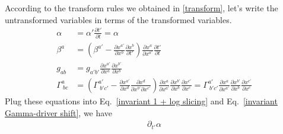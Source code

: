 \documentclass[letterpaper,nofootinbib,prd,amsmath,onecolumn]{revtex4-1}
\begin{document}
According to the transform rules we obtained in \ref{transform}, let's write the untransformed variables in terms of the transformed variables. 
\begin{align}
\alpha & = \alpha'\frac{\partial t'}{\partial t} = \alpha\\
\beta^{a} & = \left(\beta^{a'} - \frac{\partial x^{a'}}{\partial x^{b}}\frac{\partial x^{b}}{\partial t'}\right)\frac{\partial x^{a}}{\partial x^{a'}}\frac{\partial t'}{\partial t}\\
g_{ab} & = g_{a'b'}\frac{\partial x^{a'}}{\partial x^{a}}\frac{\partial x^{b'}}{\partial x^{b}}\\
\Gamma^{a}_{~bc} & = \left(\Gamma^{a'}_{~b'c'} - \frac{\partial x^{a'}}{\partial x^{d}}\frac{\partial x^{d}}{\partial x^{b'}\partial x^{c'}}\right)\frac{\partial x^{a}}{\partial x^{a'}}\frac{\partial x^{b'}}{\partial x^{b}}\frac{\partial x^{c'}}{\partial x^{c}} = \Gamma^{a'}_{~b'c'}\frac{\partial x^{a}}{\partial x^{a'}}\frac{\partial x^{b'}}{\partial x^{b}}\frac{\partial x^{c'}}{\partial x^{c}}
\end{align}
Plug these equations into Eq.~\ref{invariant 1 + log slicing} and Eq.~\ref{invariant Gamma-driver shift}, we have
\begin{align}
\partial_{t'}\alpha
\end{align}
\end{document}
